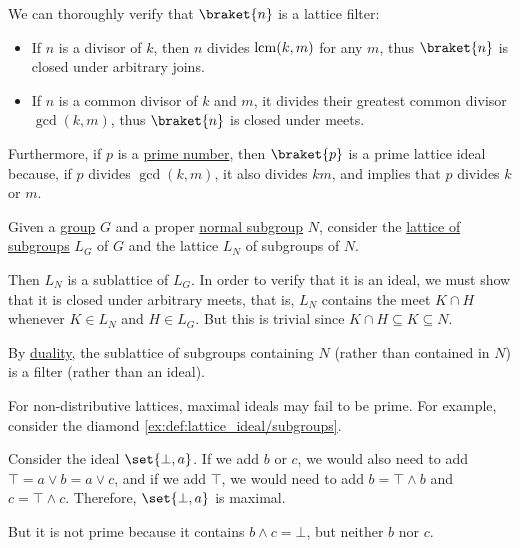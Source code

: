 \begin{example}
\begin{thmenum}
    We can thoroughly verify that \( \braket{ n } \) is a lattice filter:
    \begin{itemize}
      \item If \( n \) is a divisor of \( k \), then \( n \) divides \( \operatorname{lcm}(k, m) \) for any \( m \), thus \( \braket{ n } \) is closed under arbitrary joins.
      \item If \( n \) is a common divisor of \( k \) and \( m \), it divides their greatest common divisor \( \gcd(k, m) \), thus \( \braket{ n } \) is closed under meets.
    \end{itemize}

    Furthermore, if \( p \) is a \hyperref[def:prime_number]{prime number}, then \( \braket{ p } \) is a prime lattice ideal because, if \( p \) divides \( \gcd(k, m) \), it also divides \( km \), and  implies that \( p \) divides \( k \) or \( m \).

     Given a \hyperref[def:group]{group} \( G \) and a proper \hyperref[def:normal_subgroup]{normal subgroup} \( N \), consider the \hyperref[thm:substructures_form_complete_lattice]{lattice of subgroups} \( L_G \) of \( G \) and the lattice \( L_N \) of subgroups of \( N \).

    Then \( L_N \) is a sublattice of \( L_G \). In order to verify that it is an ideal, we must show that it is closed under arbitrary meets, that is, \( L_N \) contains the meet \( K \cap H \) whenever \( K \in L_N \) and \( H \in L_G \). But this is trivial since \( K \cap H \subseteq K \subseteq N \).

    By \hyperref[thm:lattice_duality]{duality}, the sublattice of subgroups containing \( N \) (rather than contained in \( N \)) is a filter (rather than an ideal).

     For non-distributive lattices, maximal ideals may fail to be prime. For example, consider the diamond \eqref{ex:def:lattice_ideal/subgroups}.

    Consider the ideal \( \set{ \bot, a } \). If we add \( b \) or \( c \), we would also need to add \( \top = a \vee b = a \vee c \), and if we add \( \top \), we would need to add \( b = \top \wedge b \) and \( c = \top \wedge c \). Therefore, \( \set{ \bot, a } \) is maximal.

    But it is not prime because it contains \( b \wedge c = \bot \), but neither \( b \) nor \( c \).
  \end{thmenum}
\end{example}

